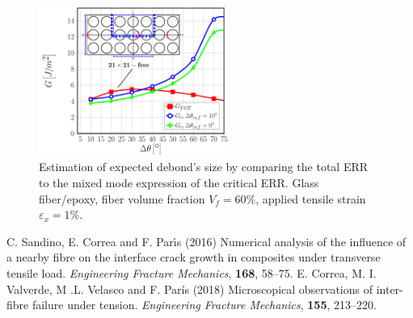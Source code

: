 \documentclass[12pt,a4paper]{article}
\begin{document}
\begin{figure}[h]
\centering\includegraphics[width=0.555\textwidth]{vf60-GTOT.pdf}
\caption{Estimation of expected debond's size by comparing the total ERR to the mixed mode expression of the critical ERR. Glass fiber/epoxy, fiber volume fraction $V_{f}=60\%$, applied tensile strain $\varepsilon_{x}=1\%$.}
\label{fig:sizeesti}
\end{figure}

\begin{thebibliography}{9}
%
%
 C. Sandino, E. Correa and F. Par{\'{\i}}s (2016) Numerical analysis of the influence of a nearby fibre on the interface crack growth in composites under transverse tensile load. \textit{Engineering Fracture Mechanics}, \textbf{168}, 58--75.
 E. Correa, M. I. Valverde, M .L. Velasco and F. París (2018) Microscopical observations of inter-fibre failure under tension. \textit{Engineering Fracture Mechanics}, \textbf{155}, 213--220.
%
\end{thebibliography}
\end{document}
